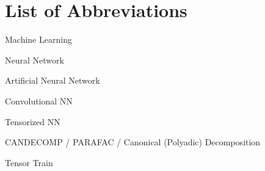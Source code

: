 \section{List of Abbreviations}

\begin{description}[leftmargin=!,labelwidth=2cm]
    \item [ML] Machine Learning
    \item [NN] Neural Network
    \item [ANN] Artificial Neural Network
    \item [CNN] Convolutional NN
    \item [TNN] Tensorized NN
    \item [CP] CANDECOMP / PARAFAC / Canonical (Polyadic) Decomposition
    \item [TT] Tensor Train

\end{description}